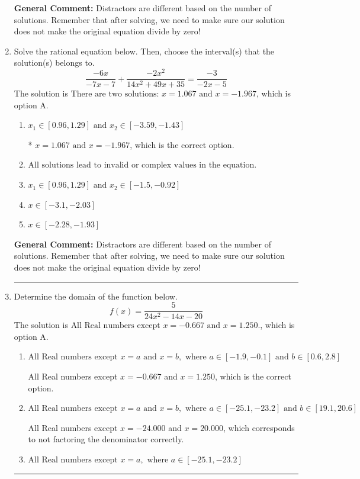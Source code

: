 \documentclass{extbook}[14pt]
\newcommand{\litem}[1]{\item #1

\rule{\textwidth}{0.4pt}}
\begin{document}
\begin{enumerate}
{\textbf{General Comment:} Distractors are different based on the number of solutions. Remember that after solving, we need to make sure our solution does not make the original equation divide by zero!
}
\litem{
Solve the rational equation below. Then, choose the interval(s) that the solution(s) belongs to.
\[ \frac{-6x}{-7x -7} + \frac{-2x^{2}}{14x^{2} +49 x + 35} = \frac{-3}{-2x -5} \]The solution is \( \text{There are two solutions: } x = 1.067 \text{ and } x = -1.967 \), which is option A.\begin{enumerate}[label=\Alph*.]
\item \( x_1 \in [0.96, 1.29] \text{ and } x_2 \in [-3.59,-1.43] \)

* $x = 1.067 \text{ and } x = -1.967$, which is the correct option.
\item \( \text{All solutions lead to invalid or complex values in the equation.} \)


\item \( x_1 \in [0.96, 1.29] \text{ and } x_2 \in [-1.5,-0.92] \)


\item \( x \in [-3.1,-2.03] \)


\item \( x \in [-2.28,-1.93] \)


\end{enumerate}

\textbf{General Comment:} Distractors are different based on the number of solutions. Remember that after solving, we need to make sure our solution does not make the original equation divide by zero!
}
\litem{
Determine the domain of the function below.
\[ f(x) = \frac{5}{24x^{2} -14 x -20} \]The solution is \( \text{All Real numbers except } x = -0.667 \text{ and } x = 1.250. \), which is option A.\begin{enumerate}[label=\Alph*.]
\item \( \text{All Real numbers except } x = a \text{ and } x = b, \text{ where } a \in [-1.9, -0.1] \text{ and } b \in [0.6, 2.8] \)

All Real numbers except $x = -0.667$ and $x = 1.250$, which is the correct option.
\item \( \text{All Real numbers except } x = a \text{ and } x = b, \text{ where } a \in [-25.1, -23.2] \text{ and } b \in [19.1, 20.6] \)

All Real numbers except $x = -24.000$ and $x = 20.000$, which corresponds to not factoring the denominator correctly.
\item \( \text{All Real numbers except } x = a, \text{ where } a \in [-25.1, -23.2] \)


\end{enumerate}}
\end{enumerate}
\end{document}
